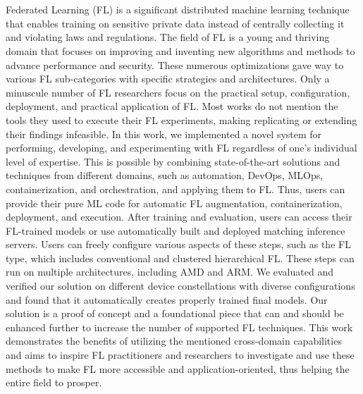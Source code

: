 \chapter{\abstractname}

Federated Learning (FL) is a significant distributed machine learning technique that enables training on sensitive private data instead of centrally collecting it and violating laws and regulations.
The field of FL is a young and thriving domain that focuses on improving and inventing new algorithms and methods to advance performance and security.
These numerous optimizations gave way to various FL sub-categories with specific strategies and architectures.
Only a minuscule number of FL researchers focus on the practical setup, configuration, deployment, and practical application of FL.
Most works do not mention the tools they used to execute their FL experiments, making replicating or extending their findings infeasible.
In this work, we implemented a novel system for performing, developing, and experimenting with FL regardless of one's individual level of expertise.
This is possible by combining state-of-the-art solutions and techniques from different domains, such as automation, DevOps, MLOps, containerization, and orchestration, and applying them to FL.
Thus, users can provide their pure ML code for automatic FL augmentation, containerization, deployment, and execution.
After training and evaluation, users can access their FL-trained models or use automatically built and deployed matching inference servers.
Users can freely configure various aspects of these steps, such as the FL type, which includes conventional and clustered hierarchical FL.
These steps can run on multiple architectures, including AMD and ARM.
We evaluated and verified our solution on different device constellations with diverse configurations and found that it automatically creates properly trained final models.
Our solution is a proof of concept and a foundational piece that can and should be enhanced further to increase the number of supported FL techniques.
This work demonstrates the benefits of utilizing the mentioned cross-domain capabilities and aims to inspire FL practitioners and researchers to investigate and use these methods to make FL more accessible and application-oriented, thus helping the entire field to prosper.